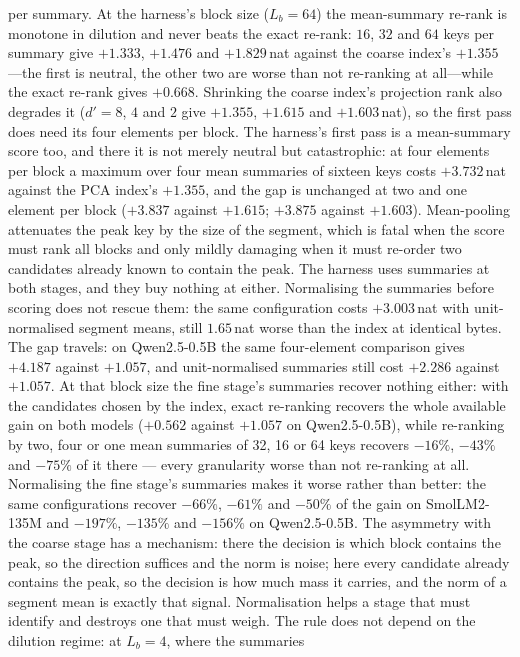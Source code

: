 \documentclass[sigconf,nonacm,11pt]{acmart}
\begin{document}
per summary. At the harness's block size ($L_b=64$) the mean-summary re-rank is
monotone in dilution and never beats the exact re-rank: $16$, $32$ and $64$ keys per
summary give $+1.333$, $+1.476$ and $+1.829$\,nat against the coarse index's
$+1.355$---the first is neutral, the other two are worse than not re-ranking at
all---while the exact re-rank gives $+0.668$. Shrinking the coarse index's projection
rank also degrades it ($d'=8$, $4$ and $2$ give $+1.355$, $+1.615$ and $+1.603$\,nat),
so the first pass does need its four elements per block. The harness's first pass is a
mean-summary score too, and there it is not merely neutral but catastrophic: at four
elements per block a maximum over four mean summaries of sixteen keys costs
$+3.732$\,nat against the PCA index's $+1.355$, and the gap is unchanged at two and one
element per block ($+3.837$ against $+1.615$; $+3.875$ against $+1.603$). Mean-pooling
attenuates the peak key by the size of the segment, which is fatal when the score must
rank all blocks and only mildly damaging when it must re-order two candidates already
known to contain the peak. The harness uses summaries at both stages, and they buy
nothing at either. Normalising the summaries before scoring does not rescue them: the same
configuration costs $+3.003$\,nat with unit-normalised segment means, still $1.65$\,nat
worse than the index at identical bytes. The gap travels: on Qwen2.5-0.5B the same four-element comparison gives
$+4.187$ against $+1.057$, and unit-normalised summaries still cost $+2.286$ against
$+1.057$. At that block size the fine stage's summaries recover nothing either: with the
candidates chosen by the index, exact re-ranking recovers the whole available gain on
both models ($+0.562$ against $+1.057$ on Qwen2.5-0.5B), while re-ranking by two, four
or one mean summaries of 32, 16 or 64 keys recovers $-16\%$, $-43\%$ and $-75\%$ of it
there --- every granularity worse than not re-ranking at all. Normalising the fine stage's summaries makes it worse rather than better:
the same configurations recover $-66\%$, $-61\%$ and $-50\%$ of the gain on
SmolLM2-135M and $-197\%$, $-135\%$ and $-156\%$ on Qwen2.5-0.5B. The asymmetry with
the coarse stage has a mechanism: there the decision is which block contains the peak,
so the direction suffices and the norm is noise; here every candidate already contains
the peak, so the decision is how much mass it carries, and the norm of a segment mean
is exactly that signal. Normalisation helps a stage that must identify and destroys one
that must weigh. The rule does not depend on the dilution regime: at $L_b=4$, where the summaries
\end{document}
